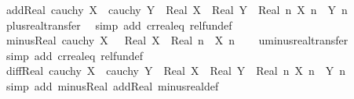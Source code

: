 \begin{isabellebody}
\isanewline
{}\isamarkupfalse%
\ add{\isacharunderscore}{\kern0pt}Real{\isacharcolon}{\kern0pt}\ {\isachardoublequoteopen}cauchy\ X\ {\isasymLongrightarrow}\ cauchy\ Y\ {\isasymLongrightarrow}\ Real\ X\ {\isacharplus}{\kern0pt}\ Real\ Y\ {\isacharequal}{\kern0pt}\ Real\ {\isacharparenleft}{\kern0pt}{\isasymlambda}n{\isachardot}{\kern0pt}\ X\ n\ {\isacharplus}{\kern0pt}\ Y\ n{\isacharparenright}{\kern0pt}{\isachardoublequoteclose}\isanewline
%
\isadelimproof
\ \ %
\endisadelimproof
%
\isatagproof
{}\isamarkupfalse%
\ plus{\isacharunderscore}{\kern0pt}real{\isachardot}{\kern0pt}transfer\ \isamarkupfalse%
\ {\isacharparenleft}{\kern0pt}simp\ add{\isacharcolon}{\kern0pt}\ cr{\isacharunderscore}{\kern0pt}real{\isacharunderscore}{\kern0pt}eq\ rel{\isacharunderscore}{\kern0pt}fun{\isacharunderscore}{\kern0pt}def{\isacharparenright}{\kern0pt}%
\endisatagproof
{\isafoldproof}%
%
\isadelimproof
\isanewline
%
\endisadelimproof
\isanewline
{}\isamarkupfalse%
\ minus{\isacharunderscore}{\kern0pt}Real{\isacharcolon}{\kern0pt}\ {\isachardoublequoteopen}cauchy\ X\ {\isasymLongrightarrow}\ {\isacharminus}{\kern0pt}\ Real\ X\ {\isacharequal}{\kern0pt}\ Real\ {\isacharparenleft}{\kern0pt}{\isasymlambda}n{\isachardot}{\kern0pt}\ {\isacharminus}{\kern0pt}\ X\ n{\isacharparenright}{\kern0pt}{\isachardoublequoteclose}\isanewline
%
\isadelimproof
\ \ %
\endisadelimproof
%
\isatagproof
{}\isamarkupfalse%
\ uminus{\isacharunderscore}{\kern0pt}real{\isachardot}{\kern0pt}transfer\ \isamarkupfalse%
\ {\isacharparenleft}{\kern0pt}simp\ add{\isacharcolon}{\kern0pt}\ cr{\isacharunderscore}{\kern0pt}real{\isacharunderscore}{\kern0pt}eq\ rel{\isacharunderscore}{\kern0pt}fun{\isacharunderscore}{\kern0pt}def{\isacharparenright}{\kern0pt}%
\endisatagproof
{\isafoldproof}%
%
\isadelimproof
\isanewline
%
\endisadelimproof
\isanewline
{}\isamarkupfalse%
\ diff{\isacharunderscore}{\kern0pt}Real{\isacharcolon}{\kern0pt}\ {\isachardoublequoteopen}cauchy\ X\ {\isasymLongrightarrow}\ cauchy\ Y\ {\isasymLongrightarrow}\ Real\ X\ {\isacharminus}{\kern0pt}\ Real\ Y\ {\isacharequal}{\kern0pt}\ Real\ {\isacharparenleft}{\kern0pt}{\isasymlambda}n{\isachardot}{\kern0pt}\ X\ n\ {\isacharminus}{\kern0pt}\ Y\ n{\isacharparenright}{\kern0pt}{\isachardoublequoteclose}\isanewline
%
\isadelimproof
\ \ %
\endisadelimproof
%
\isatagproof
{}\isamarkupfalse%
\ {\isacharparenleft}{\kern0pt}simp\ add{\isacharcolon}{\kern0pt}\ minus{\isacharunderscore}{\kern0pt}Real\ add{\isacharunderscore}{\kern0pt}Real\ minus{\isacharunderscore}{\kern0pt}real{\isacharunderscore}{\kern0pt}def{\isacharparenright}{\kern0pt}%

\end{isabellebody}
